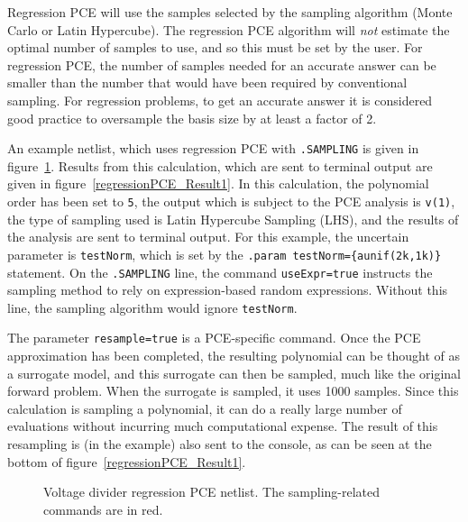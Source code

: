 Regression PCE will use the samples selected by the sampling algorithm (Monte Carlo or Latin Hypercube).  
The regression PCE algorithm will \emph{not} estimate the optimal number of samples to use, and so this must 
be set by the user.   For regression PCE, the number of samples needed for an accurate answer
can be smaller than the number that would have been required by conventional sampling.
For regression problems, to get an accurate answer it is considered good practice to oversample 
the basis size by at least a factor of 2. 

An example netlist, which uses regression PCE with \texttt{.SAMPLING} is given in figure~\ref{regressionPCE_Netlist1}.  
Results from this calculation, which are sent to terminal output are given in figure~\ref{regressionPCE_Result1}.
In this calculation, the polynomial order has been set to \texttt{5}, the output which is subject to the PCE analysis 
is \texttt{v(1)}, the type of sampling used is Latin Hypercube Sampling (LHS), and the results of the analysis are 
sent to terminal output.    For this example, the uncertain parameter is \texttt{testNorm}, which is
set by the \texttt{.param testNorm=\{aunif(2k,1k)\}} statement.  On the \texttt{.SAMPLING} line, 
the command \texttt{useExpr=true} instructs the sampling method to rely on expression-based 
random expressions.  Without this line, the sampling algorithm would ignore \texttt{testNorm}.

The parameter \texttt{resample=true} is a PCE-specific command.   Once the PCE approximation 
has been completed, the resulting polynomial can be thought of as a surrogate model, and this
surrogate can then be sampled, much like the original forward problem.  When the surrogate is 
sampled, it uses 1000 samples.    Since this calculation is sampling a polynomial, it can do 
a really large number of evaluations without incurring much computational expense.
The result of this resampling is (in the example) also sent to the console, as can be 
seen at the bottom of figure~\ref{regressionPCE_Result1}.

\begin{figure}[htbp]
\fontsize{9pt}{10pt}
\begin{centering}
\caption{Voltage divider regression PCE netlist.  The sampling-related commands are in \color{red}red\color{black}.
\label{regressionPCE_Netlist1}}
\end{centering}
\end{figure}


